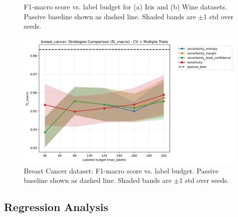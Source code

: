\documentclass[conference]{IEEEtran}
\begin{document}
\begin{figure}[t]
\centering
{}
\hfill
{}
\caption{F1-macro score vs. label budget for (a) Iris and (b) Wine datasets. Passive baseline shown as dashed line. Shaded bands are $\pm$1 std over seeds.}
\label{fig:f1-compare}
\end{figure}

\begin{figure}[t]
\centering
\includegraphics[width=0.95\columnwidth]{figures/cls_breast_cancer_comparison_f1_macro.png}
\caption{Breast Cancer dataset: F1-macro score vs. label budget. Passive baseline shown as dashed line. Shaded bands are $\pm$1 std over seeds.}
\label{fig:breast-f1-compare}
\end{figure}

\subsection{Regression Analysis}
\end{document}
